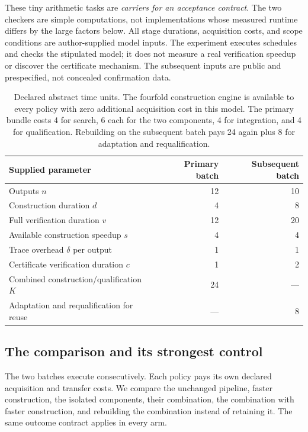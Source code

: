 \documentclass[11pt,letterpaper]{article}
\theoremstyle{remark}\newtheorem{remark}{Remark}[section]
\begin{document}
These tiny arithmetic tasks are \emph{carriers for an acceptance contract}.
The two checkers are simple computations, not implementations whose measured runtime differs by the large factors below.
All stage durations, acquisition costs, and scope conditions are author-supplied model inputs.
The experiment executes schedules and checks the stipulated model; it does not measure a real verification speedup or discover the certificate mechanism.
The subsequent inputs are public and prespecified, not concealed confirmation data.

\begin{table}[t]
\centering\small
\begin{tabularx}{\linewidth}{Yrr}
\toprule
Supplied parameter & Primary batch & Subsequent batch\\
\midrule
Outputs $n$ & 12 & 10\\
Construction duration $d$ & 4 & 8\\
Full verification duration $v$ & 12 & 20\\
Available construction speedup $s$ & 4 & 4\\
Trace overhead $\delta$ per output & 1 & 1\\
Certificate verification duration $c$ & 1 & 2\\
Combined construction/qualification $K$ & 24 & ---\\
Adaptation and requalification for reuse & --- & 8\\
\bottomrule
\end{tabularx}
\caption{Declared abstract time units. The fourfold construction engine is available to every policy with zero additional acquisition cost in this model. The primary bundle costs 4 for search, 6 each for the two components, 4 for integration, and 4 for qualification. Rebuilding on the subsequent batch pays 24 again plus 8 for adaptation and requalification.}
\label{tab:params}
\end{table}

\subsection{The comparison and its strongest control}
The two batches execute consecutively.
Each policy pays its own declared acquisition and transfer costs.
We compare the unchanged pipeline, faster construction, the isolated components, their combination, the combination with faster construction, and rebuilding the combination instead of retaining it.
The same outcome contract applies in every arm.
\end{document}

